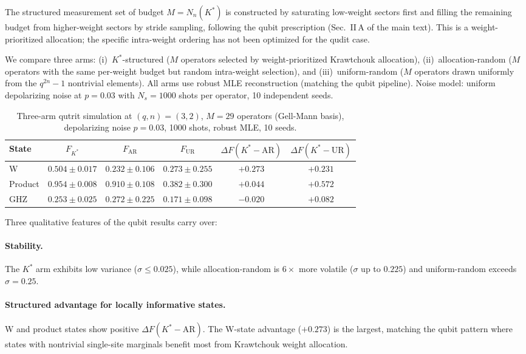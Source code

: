 \documentclass[twocolumn,prx,aps,superscriptaddress,longbibliography]{revtex4-2}
\begin{document}
The structured measurement set of budget $M = N_n(K^*)$ is
constructed by saturating low-weight sectors first and filling the
remaining budget from higher-weight sectors by stride sampling,
following the qubit prescription (Sec.~II\,A of the main text).  This is
a weight-prioritized allocation; the specific intra-weight ordering
has not been optimized for the qudit case.

We compare three arms: (i)~$K^*$-structured ($M$ operators selected
by weight-prioritized Krawtchouk allocation), (ii)~allocation-random
($M$ operators with the same per-weight budget but random
intra-weight selection), and (iii)~uniform-random ($M$ operators
drawn uniformly from the $q^{2n} - 1$ nontrivial elements).  All
arms use robust MLE reconstruction (matching the qubit pipeline).
Noise model: uniform depolarizing noise at $p = 0.03$ with
$N_s = 1000$ shots per operator, 10 independent seeds.

\begin{table}
\caption{Three-arm qutrit simulation at $(q, n) = (3, 2)$,
$M = 29$ operators (Gell-Mann basis), depolarizing noise
$p = 0.03$, 1000 shots, robust MLE, 10 seeds.}
\label{tab:sim}
\begin{ruledtabular}
\begin{tabular}{lccccc}
State & $F_{K^*}$ & $F_\mathrm{AR}$ & $F_\mathrm{UR}$ &
$\Delta F(K^*{-}\mathrm{AR})$ & $\Delta F(K^*{-}\mathrm{UR})$ \\
\hline
W       & $0.504 \pm 0.017$ & $0.232 \pm 0.106$ &
$0.273 \pm 0.255$ & $+0.273$ & $+0.231$ \\
Product & $0.954 \pm 0.008$ & $0.910 \pm 0.108$ &
$0.382 \pm 0.300$ & $+0.044$ & $+0.572$ \\
GHZ     & $0.253 \pm 0.025$ & $0.272 \pm 0.225$ &
$0.171 \pm 0.098$ & $-0.020$ & $+0.082$ \\
\end{tabular}
\end{ruledtabular}
\end{table}

Three qualitative features of the qubit results carry over:

\paragraph{Stability.}
The $K^*$ arm exhibits low variance ($\sigma \leq 0.025$),
while allocation-random is $6\times$ more volatile ($\sigma$ up
to $0.225$) and uniform-random exceeds $\sigma = 0.25$.

\paragraph{Structured advantage for locally informative states.}
W and product states show positive $\Delta F(K^*{-}\mathrm{AR})$.
The W-state advantage ($+0.273$) is the largest, matching the
qubit pattern where states with nontrivial single-site marginals
benefit most from Krawtchouk weight allocation.
\end{document}
